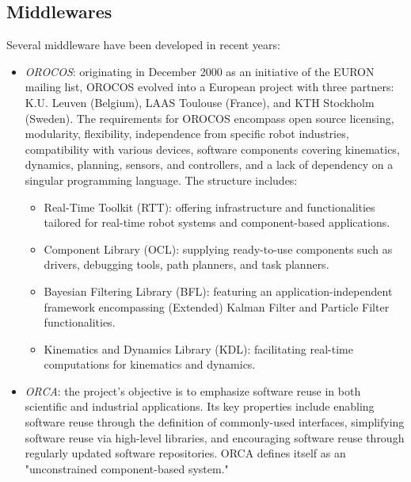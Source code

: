 \subsection{Middlewares}
Several middleware have been developed in recent years:
\begin{itemize}
    \item \textit{OROCOS}: originating in December 2000 as an initiative of the EURON mailing list, OROCOS evolved into a European project with three partners: K.U. Leuven (Belgium), LAAS Toulouse (France), and KTH Stockholm (Sweden).
        The requirements for OROCOS encompass open source licensing, modularity, flexibility, independence from specific robot industries, compatibility with various devices, software components covering kinematics, dynamics, planning, sensors, and controllers, and a lack of dependency on a singular programming language.
        The structure includes:
        \begin{itemize}
            \item Real-Time Toolkit (RTT): offering infrastructure and functionalities tailored for real-time robot systems and component-based applications.
            \item Component Library (OCL): supplying ready-to-use components such as drivers, debugging tools, path planners, and task planners.
            \item Bayesian Filtering Library (BFL): featuring an application-independent framework encompassing (Extended) Kalman Filter and Particle Filter functionalities.
            \item Kinematics and Dynamics Library (KDL): facilitating real-time computations for kinematics and dynamics.
        \end{itemize}
    \item \textit{ORCA}: the project's objective is to emphasize software reuse in both scientific and industrial applications. 
        Its key properties include enabling software reuse through the definition of commonly-used interfaces, simplifying software reuse via high-level libraries, and encouraging software reuse through regularly updated software repositories. 
        ORCA defines itself as an "unconstrained component-based system."
        

\end{itemize}
